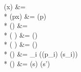 \binds(x) &=  \\*
\binds(p\;\;x) &= \binds(p) \cup {} \\*
\binds(\varepsilon) &= \varnothing \\*
\binds( \cons {}) &= \binds() \\*
\binds( \cons {}) &=  \cup \binds() \\*
\binds() &{}= \textstyle\bigcup_i \big(\binds(p_i) \cup \binds(s_i)\big) \\*
\binds() &= \binds(s) \cup \binds(s')
